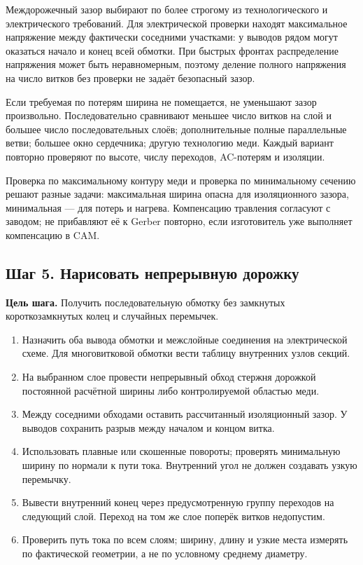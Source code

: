 \documentclass[14pt,a4paper]{extarticle}
\newcommand{\stepgoal}[1]{\par\noindent\textbf{Цель шага.} #1\par}
\begin{document}
Междорожечный зазор выбирают по более строгому из технологического и электрического требований. Для электрической проверки находят максимальное напряжение между фактически соседними участками: у выводов рядом могут оказаться начало и конец всей обмотки. При быстрых фронтах распределение напряжения может быть неравномерным, поэтому деление полного напряжения на число витков без проверки не задаёт безопасный зазор.

Если требуемая по потерям ширина не помещается, не уменьшают зазор произвольно. Последовательно сравнивают меньшее число витков на слой и большее число последовательных слоёв; дополнительные полные параллельные ветви; большее окно сердечника; другую технологию меди. Каждый вариант повторно проверяют по высоте, числу переходов, AC-потерям и изоляции.

Проверка по максимальному контуру меди и проверка по минимальному сечению решают разные задачи: максимальная ширина опасна для изоляционного зазора, минимальная --- для потерь и нагрева. Компенсацию травления согласуют с заводом; не прибавляют её к Gerber повторно, если изготовитель уже выполняет компенсацию в CAM.

\subsection{Шаг 5. Нарисовать непрерывную дорожку}
\stepgoal{Получить последовательную обмотку без замкнутых короткозамкнутых колец и случайных перемычек.}
\begin{enumerate}
\item Назначить оба вывода обмотки и межслойные соединения на электрической схеме. Для многовитковой обмотки вести таблицу внутренних узлов секций.
\item На выбранном слое провести непрерывный обход стержня дорожкой постоянной расчётной ширины либо контролируемой областью меди.
\item Между соседними обходами оставить рассчитанный изоляционный зазор. У выводов сохранить разрыв между началом и концом витка.
\item Использовать плавные или скошенные повороты; проверять минимальную ширину по нормали к пути тока. Внутренний угол не должен создавать узкую перемычку.
\item Вывести внутренний конец через предусмотренную группу переходов на следующий слой. Переход на том же слое поперёк витков недопустим.
\item Проверить путь тока по всем слоям; ширину, длину и узкие места измерять по фактической геометрии, а не по условному среднему диаметру.
\end{enumerate}
\end{document}
